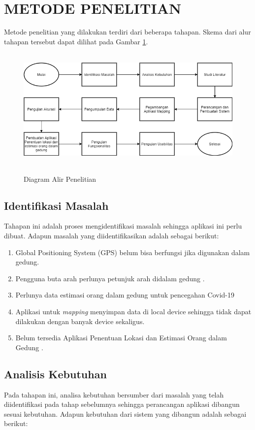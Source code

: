 \section{\uppercase{METODE PENELITIAN}}
Metode penelitian yang dilakukan terdiri dari beberapa tahapan. Skema dari alur tahapan tersebut dapat dilihat pada Gambar \ref{metpen}.
\begin{figure}[H]
	\centering
	{\includegraphics [width = 14cm, height= 6cm]{gambar/metodepenelitian.drawio }}
	\caption{Diagram Alir Penelitian}
	\label{metpen}
\end{figure}

\fancyhf{}
\fancyfoot[R]{\thepage}

\subsection{Identifikasi Masalah}
Tahapan ini adalah proses mengidentifikasi masalah sehingga aplikasi ini perlu dibuat. Adapun masalah yang diidentifikasikan adalah sebagai berikut:
\begin{enumerate}[1.]
	\itemsep0em
	\item Global Positioning System (GPS) belum bisa berfungsi jika digunakan dalam gedung.
	\item Pengguna buta arah perlunya petunjuk arah didalam gedung
	      \citep{Keluza2017}.
	\item Perlunya data estimasi orang dalam gedung untuk pencegahan Covid-19
	\item Aplikasi untuk \textit{mapping} menyimpan data di local device sehingga tidak dapat dilakukan dengan banyak device sekaligus.
	\item Belum tersedia Aplikasi Penentuan Lokasi dan Estimasi Orang dalam Gedung .
\end{enumerate}

\subsection{Analisis Kebutuhan}
Pada tahapan ini, analisa kebutuhan bersumber dari masalah yang telah diidentifikasi pada tahap sebelumnya sehingga perancangan aplikasi dibangun sesuai kebutuhan. Adapun kebutuhan dari sistem yang dibangun adalah sebagai berikut:


